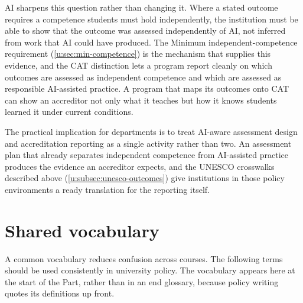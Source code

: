 \documentclass{SIAMbook2023}
\begin{document}
AI sharpens this question rather than changing it. Where a stated outcome requires a competence students must hold independently, the institution must be able to show that the outcome was assessed independently of AI, not inferred from work that AI could have produced. The Minimum independent-competence requirement (\cref{u:sec:min-competence}) is the mechanism that supplies this evidence, and the CAT distinction lets a program report cleanly on which outcomes are assessed as independent competence and which are assessed as responsible AI-assisted practice. A program that maps its outcomes onto CAT can show an accreditor not only what it teaches but how it knows students learned it under current conditions.

The practical implication for departments is to treat AI-aware assessment design and accreditation reporting as a single activity rather than two. An assessment plan that already separates independent competence from AI-assisted practice produces the evidence an accreditor expects, and the UNESCO crosswalks described above (\cref{u:subsec:unesco-outcomes}) give institutions in those policy environments a ready translation for the reporting itself.

\section{Shared vocabulary}
\label{u:sec:vocabulary}%
%

A common vocabulary reduces confusion across courses. The following terms should be used consistently in university policy. The vocabulary appears here at the start of the Part, rather than in an end glossary, because policy writing quotes its definitions up front.
\end{document}
